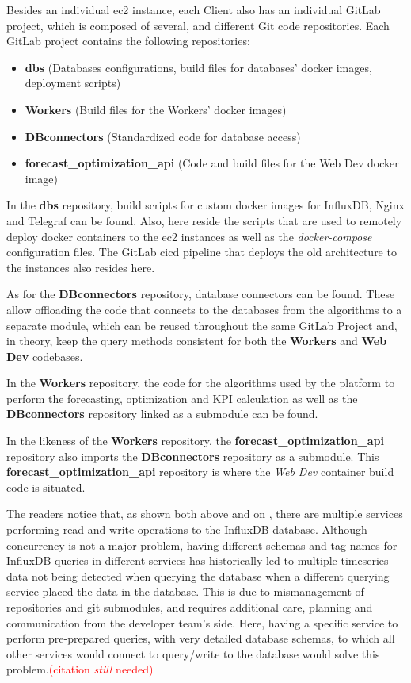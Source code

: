 Besides an individual \gls{ec2} instance, each Client also has an individual GitLab \parencite{gitlab_2022} project, which is composed of several, and different Git \parencite{git} code repositories. Each GitLab project contains the following repositories:

\begin{itemize}

    \item \textbf{dbs} (Databases configurations, build files for databases' docker images, deployment scripts)
    \item \textbf{Workers} (Build files for the Workers' docker images)
    \item \textbf{DBconnectors} (Standardized code for database access)
    \item \textbf{forecast\_optimization\_api} (Code and build files for the Web Dev docker image)
    
\end{itemize}

In the \textbf{dbs} repository, build scripts for custom docker images for InfluxDB, Nginx and Telegraf can be found. Also, here reside the scripts that are used to remotely deploy docker containers to the \gls{ec2} instances as well as the \textit{docker-compose} configuration files. The GitLab \gls{cicd} pipeline that deploys the old architecture to the instances also resides here.

As for the \textbf{DBconnectors} repository, database connectors can be found. These allow offloading the code that connects to the databases from the algorithms to a separate module, which can be reused throughout the same GitLab Project and, in theory, keep the query methods consistent for both the \textbf{Workers} and \textbf{Web Dev} codebases.

In the \textbf{Workers} repository, the code for the algorithms used by the platform to perform the forecasting, optimization and KPI calculation as well as the \textbf{DBconnectors} repository linked as a submodule can be found.

In the likeness of the \textbf{Workers} repository, the \textbf{forecast\_optimization\_api} repository also imports the \textbf{DBconnectors} repository as a submodule. This \textbf{forecast\_optimization\_api} repository is where the \textit{Web Dev} container build code is situated. 

The readers notice that, as shown both above and on , there are multiple services performing read and write operations to the InfluxDB database. Although concurrency is not a major problem, having different schemas and tag names for InfluxDB queries in different services has historically led to multiple timeseries data not being detected when querying the database when a different querying service placed the data in the database. This is due to mismanagement of repositories and git submodules, and requires additional care, planning and communication from the developer team's side. Here, having a specific service to perform pre-prepared queries, with very detailed database schemas, to which all other services would connect to query/write to the database would solve this problem.\textcolor{red}{(citation \textit{still} needed)}

